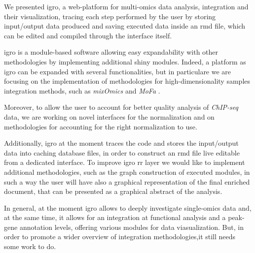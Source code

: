 We presented \gls{igro}, a web-platform for multi-omics data analysis, integration and their visualization, tracing each step performed by the user by storing input/output data produced and saving executed data inside an \gls{rmd} file, which can be edited and compiled through the interface itself.

\gls{igro} is a module-based software allowing easy expandability with other methodologies by implementing additional shiny modules.
Indeed, a platform as \gls{igro} can be expanded with several functionalities, but in particulare we are focusing on the implementation of methodologies for high-dimensionality samples integration methods, such as \textit{mixOmics} \cite{Rohart2017} and \textit{MoFa} \cite{Argelaguet2018}.

Moreover, to allow the user to account for better quality analysis of \textit{ChIP-seq} data, we are working on novel interfaces for the normalization and on methodologies for accounting for the right normalization to use.

Additionally, \gls{igro} at the moment traces the code and stores the input/output data into caching database files, in order to construct an \gls{rmd} file live editable from a dedicated interface.
To improve \gls{igro} \gls{rr} layer we would like to implement additional methodologies, such as the graph construction of executed modules, in such a way the user will have also a graphical representation of the final enriched document, that can be presented as a graphical abstract of the analysis.

In general, at the moment \gls{igro} allows to deeply investigate single-omics data and, at the same time, it allows for an integration at functional analysis and a peak-gene annotation levels, offering various modules for data viasualization.
But, in order to promote a wider overview of integration methodologies,it still needs some work to do.
